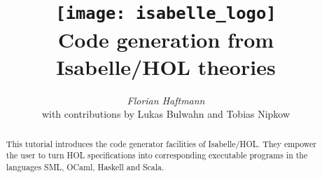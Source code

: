 \documentclass[12pt,a4paper,fleqn]{article}
\title{\texttt{[image: isabelle\_logo]}
  \\[4ex] Code generation from Isabelle/HOL theories}
\author{\emph{Florian Haftmann}\\ with contributions by Lukas Bulwahn and Tobias Nipkow}
\begin{document}
\maketitle

\begin{abstract}
  \noindent This tutorial introduces the code generator facilities of Isabelle/HOL.
    They empower the user to turn HOL specifications into corresponding executable
    programs in the languages SML, OCaml, Haskell and Scala.
\end{abstract}

\thispagestyle{empty}\clearpage

\clearfirst











\begingroup
 \small\raggedright\frenchspacing

\endgroup
\end{document}
